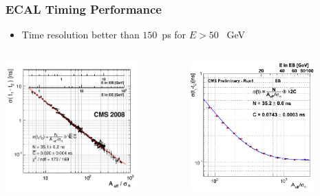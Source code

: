 \documentclass{beamer}
\begin{document}
   
  
   
\begin{frame}
\frametitle{ECAL Timing Performance}
\begin{minipage}[b]{0.85\paperwidth}
  \begin{tcolorbox}[colback=UNL@Cream!5,colframe=UNL@LightGrey!70,title=\textcolor{UMN@Maroon}{\textbf{ECAL Timing Resolution}}]
     \begin{itemize}
     \item  Time resolution better than $150$~ps for $E > 50$ ~GeV
     \end{itemize}
  \begin{columns}
   \begin{column}{0.50\linewidth}
     \begin{tcolorbox}[colback=UNL@Cream!5,colframe=UNL@Cream!70,title=\textcolor{UMN@Maroon}{\textbf{Test Beam }}] 
    \includegraphics[height=5.0cm,width=\textwidth]            {THESISPLOTS/ECAL_Timing_Resolution.png}
    \end{tcolorbox}
   \end{column}
   \begin{column}{0.55\linewidth}
     \begin{tcolorbox}[colback=UNL@Cream!5,colframe=UNL@Cream!70,title=\textcolor{UMN@Maroon}{\textbf{LHC RUN I}}]
      \includegraphics[height=5.0cm,width=\textwidth]            {THESISPLOTS/NeigboMethodECALTimeRes.png}
     \end{tcolorbox} 
     \end{column} 
    \end{columns} 
   \end{tcolorbox}
  \end{minipage}   
\end{frame}
\end{document}
